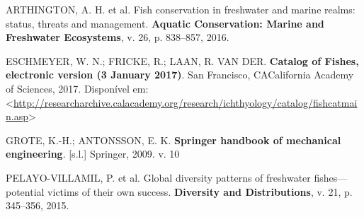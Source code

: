 \documentclass[
  12pt,
  oneside,
  a4paper,
  english,
  brazil]{abntex2}
\newlength{\cslhangindent}
\newenvironment{CSLReferences}[2] %
 {\begin{list}{}{%
  \setlength{\itemindent}{0pt}
  \setlength{\leftmargin}{0pt}
  \setlength{\parsep}{0pt}
  \ifodd #1
   \setlength{\leftmargin}{\cslhangindent}
   \setlength{\itemindent}{-1\cslhangindent}
  \fi
  \setlength{\itemsep}{#2\baselineskip}}}
 {\end{list}}
\begin{document}
\label{refs}
\begin{CSLReferences}{0}{1}
ARTHINGTON, A. H. et al. Fish conservation in freshwater and marine
realms: status, threats and management. \textbf{Aquatic Conservation:
Marine and Freshwater Ecosystems}, v. 26, p. 838--857, 2016.

ESCHMEYER, W. N.; FRICKE, R.; LAAN, R. VAN DER. \textbf{Catalog of
Fishes, electronic version ({3 January 2017})}. San Francisco,
CACalifornia Academy of Sciences, 2017. Disponível em:
\textless{}\url{http://researcharchive.calacademy.org/research/ichthyology/catalog/fishcatmain.asp}\textgreater{}

GROTE, K.-H.; ANTONSSON, E. K. \textbf{Springer handbook of mechanical
engineering}. {[}s.l.{]} Springer, 2009. v. 10

PELAYO-VILLAMIL, P. et al. Global diversity patterns of freshwater
fishes---potential victims of their own success. \textbf{Diversity and
Distributions}, v. 21, p. 345--356, 2015.

\end{CSLReferences}
\end{document}
